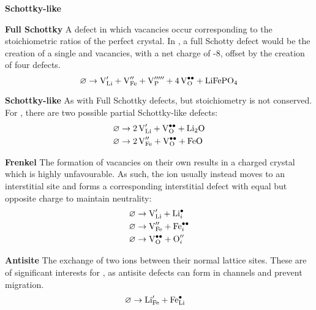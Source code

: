 \begin{labeling}{\textbf{Schottky-like}}
\item[\textbf{Full Schottky}] A defect in which vacancies occur corresponding to the stoichiometric ratios of the perfect crystal. In , a full Schotty defect would be the creation of a single  and  vacancies, with a net charge of -8, offset by the creation of four  defects.
\begin{equation}
\varnothing \rightarrow \ce{V^\prime_{Li} +  V^{\prime \prime}_{Fe} + V^{\prime \prime \prime \prime \prime}_{P} + 4V^{\bullet \bullet}_{O} + LiFePO4}
\end{equation}
\item[\textbf{Schottky-like}] As with Full Schottky defects, but stoichiometry is not conserved.
For , there are two possible partial Schottky-like defects:
\begin{align}
\varnothing &\rightarrow \ce{2V^\prime_{Li} + V^{\bullet \bullet}_{O} + Li2O} \\
\varnothing &\rightarrow \ce{2V^{\prime \prime}_{Fe} + V^{\bullet \bullet}_{O} + FeO}
\end{align}
\item[\textbf{Frenkel}] The formation of vacancies on their own results in a charged crystal which is highly unfavourable. As such, the ion usually instead moves to an interstitial site and forms a corresponding interstitial defect with equal but opposite charge to maintain neutrality:
\begin{align}
\varnothing &\rightarrow \ce{V^\prime_{Li} +  Li^{\bullet}_{i}}\\
\varnothing &\rightarrow \ce{V^{\prime \prime}_{Fe} +  Fe^{\bullet\bullet}_{i}}\\
\varnothing &\rightarrow \ce{V^{\bullet\bullet}_{O} +  O^{\prime \prime}_{i}}
\end{align}
\item[\textbf{Antisite}] The exchange of two ions between their normal lattice sites. These are of significant interests for , as  antisite defects can form in  channels and prevent  migration.
\begin{align}
\varnothing &\rightarrow \ce{Li^\prime_{Fe} +  Fe^{\bullet}_{Li}}
\end{align}
\end{labeling}
